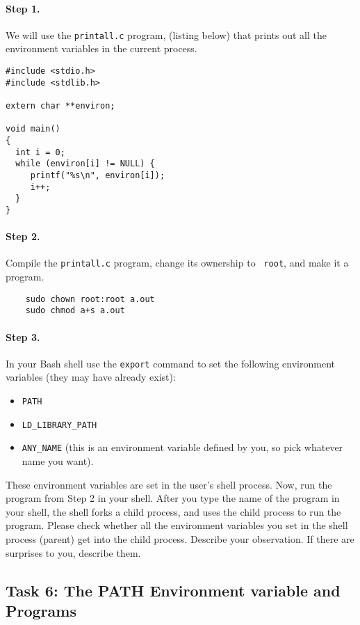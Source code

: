\paragraph{Step 1.} We will use the {\tt printall.c} program, 
(listing below) that prints out all the environment variables in the current process.

\begin{Verbatim}[frame=single]
#include <stdio.h>
#include <stdlib.h>

extern char **environ;

void main()
{
  int i = 0;
  while (environ[i] != NULL) {
     printf("%s\n", environ[i]);
     i++;
  }
}
\end{Verbatim}


\paragraph{Step 2.} Compile the {\tt printall.c} program, change its ownership to {\tt
root}, and make it a \setuid program. 
\begin{Verbatim}
    sudo chown root:root a.out
    sudo chmod a+s a.out
\end{Verbatim}
\paragraph{Step 3.} In your Bash shell 
use the {\tt export} command to set the
following environment variables (they may have already exist):
\begin{itemize}
\item {\tt PATH}
\item {\tt LD\_LIBRARY\_PATH}
\item {\tt ANY\_NAME} (this is an environment variable defined by you, so
pick whatever name you want).
\end{itemize}

These environment variables are set in the user's shell process.
Now, run the \setuid program from Step 2 in your shell. After you type the
name of the program in your shell, the shell forks a child process,
and uses the child process to run the program. Please check whether all the
environment variables you set in the shell process (parent) get into
the \setuid child process.  Describe your observation. If there are 
surprises to you, describe them.  



\subsection{Task 6: The PATH Environment variable and \setuid Programs}

